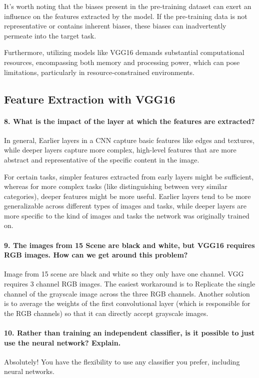 It's worth noting that the biases present in the pre-training dataset can exert an influence on the features extracted by the model. If the pre-training data is not representative or contains inherent biases, these biases can inadvertently permeate into the target task.

Furthermore, utilizing models like VGG16 demands substantial computational resources, encompassing both memory and processing power, which can pose limitations, particularly in resource-constrained environments.

\subsection{Feature Extraction with VGG16}
\paragraph{8. What is the impact of the layer at which the features are extracted?}
In general, Earlier layers in a CNN capture basic features like edges and textures, while deeper layers capture more complex, high-level features that are more abstract and representative of the specific content in the image.

For certain tasks, simpler features extracted from early layers might be sufficient, whereas for more complex tasks (like distinguishing between very similar categories), deeper features might be more useful. Earlier layers tend to be more generalizable across different types of images and tasks, while deeper layers are more specific to the kind of images and tasks the network was originally trained on.

\paragraph{9. The images from 15 Scene are black and white, but VGG16 requires RGB images. How can we get around this problem?}
Image from 15 scene are black and white so they only have one channel. VGG requires 3 channel RGB images. The easiest workaround is to Replicate the single channel of the grayscale image across the three RGB channels. Another solution is to average the weights of the first convolutional layer (which is responsible for the RGB channels) so that it can directly accept grayscale images.

\paragraph{10. Rather than training an independent classifier, is it possible to just use the neural network? Explain.}
Absolutely! You have the flexibility to use any classifier you prefer, including neural networks.

